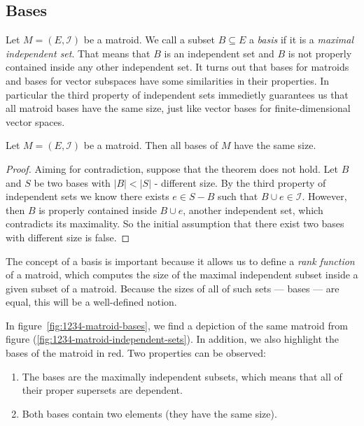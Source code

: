 \subsection{Bases}

Let $M = (E, \mathcal{I})$ be a matroid. We call a subset $B \subseteq E$ a \textit{basis} if it is a \textit{maximal independent set}. That means that $B$ is an independent set and $B$ is not properly contained inside any other independent set. It turns out that bases for matroids and bases for vector subspaces have some similarities in their properties. In particular the third property of independent sets immedietly guarantees us that all matroid bases have the same size, just like vector bases for finite-dimensional vector spaces.

\begin{theorem} \label{thm:bases-have-equal-size}
    Let $M = (E, \mathcal{I})$ be a matroid. Then all bases of $M$ have the same size.
\end{theorem}

\begin{proof}
    Aiming for contradiction, suppose that the theorem does not hold. Let $B$ and $S$ be two bases with $|B| < |S|$ - different size. By the third property of independent sets we know there exists $e \in S - B$ such that $ B \cup e \in \mathcal{I}$. However, then $B$ is properly contained inside $B \cup e$, another independent set, which contradicts its maximality. So the initial assumption that there exist two bases with different size is false.
\end{proof}

The concept of a basis is important because it allows us to define a \textit{rank function} of a matroid, which computes the size of the maximal independent subset inside a given subset of a matroid.  Because the sizes of all of such sets --- bases --- are equal, this will be a well-defined notion.

\begin{exmp}
    In figure~\ref{fig:1234-matroid-bases}, we find a depiction of the same matroid from figure (\ref{fig:1234-matroid-independent-sets}). In addition, we also highlight the bases of the matroid in red. Two properties can be observed:
\begin{enumerate}
    \item The bases are the maximally independent subsets, which means that all of their proper supersets are dependent. 
    \item Both bases contain two elements (they have the same size).
\end{enumerate}
\end{exmp}

